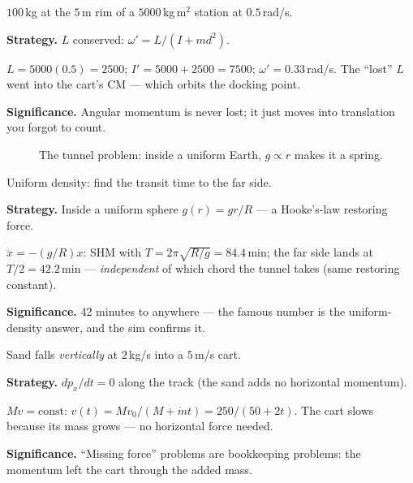 \begin{example}\label{ex:w8}
$100$\,kg at the $5$\,m rim of a $5000$\,kg\,m$^{2}$ station at
$0.5$\,rad/s.
\par\smallskip
\textbf{Strategy.} $L$ conserved: $\omega'=L/(I+md^{2})$.
\begin{solution}
$L=5000(0.5)=2500$; $I'=5000+2500=7500$;
$\omega'=0.33$\,rad/s. The ``lost'' $L$ went into the cart's CM ---
which orbits the docking point. \checkmark
\end{solution}
\textbf{Significance.} Angular momentum is never lost; it just moves
into translation you forgot to count.
\end{example}

\begin{figure}[htbp]\centering

\caption{The tunnel problem: inside a uniform Earth, $g\propto r$
makes it a spring.}
\label{fig:tunnel}
\end{figure}

\begin{example}\label{ex:w9}
Uniform density: find the transit time to the far side.
\par\smallskip
\textbf{Strategy.} Inside a uniform sphere $g(r)=gr/R$ ---
a Hooke's-law restoring force.
\begin{solution}
$\ddot x=-(g/R)x$: SHM with $T=2\pi\sqrt{R/g}=84.4$\,min; the far
side lands at $T/2=42.2$\,min --- \emph{independent} of which chord
the tunnel takes (same restoring constant). \checkmark
\end{solution}
\textbf{Significance.} 42 minutes to anywhere --- the famous number is
the uniform-density answer, and the sim confirms it.
\end{example}

\begin{example}\label{ex:w10}
Sand falls \emph{vertically} at $2$\,kg/s into a $5$\,m/s cart.
\par\smallskip
\textbf{Strategy.} $dp_x/dt=0$ along the track (the sand adds no
horizontal momentum).
\begin{solution}
$Mv=\mathrm{const}$: $v(t)=Mv_0/(M+\dot mt)=250/(50+2t)$.
The cart slows because its mass grows --- no horizontal force needed.
\checkmark
\end{solution}
\textbf{Significance.} ``Missing force'' problems are bookkeeping
problems: the momentum left the cart through the added mass.
\end{example}

